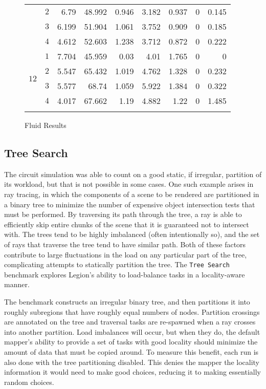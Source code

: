 \begin{figure}
{\begin{tabular}{c@{\hspace{2pt}}cD{.}{.}{3}D{.}{.}{3}@{\hspace{2pt}}D{.}{.}{3}@{\hspace{2pt}}D{.}{.}{3}@{\hspace{2pt}}D{.}{.}{3}@{\hspace{2pt}}D{.}{.}{3}@{\hspace{2pt}}D{.}{.}{3}}
 & $2$ & 6.79 & 48.992 & 0.946 & 3.182 & 0.937 & 0 & 0.145\\
 & $3$ & 6.199 & 51.904 & 1.061 & 3.752 & 0.909 & 0 & 0.185\\
 & $4$ & 4.612 & 52.603 & 1.238 & 3.712 & 0.872 & 0 & 0.222\\
\midrule
{} & $1$ & 7.704 & 45.959 & 0.03 & 4.01 & 1.765 & 0 & 0\\
 & $2$ & 5.547 & 65.432 & 1.019 & 4.762 & 1.328 & 0 & 0.232\\
 & $3$ & 5.577 & 68.74 & 1.059 & 5.922 & 1.384 & 0 & 0.322\\
 & $4$ & 4.017 & 67.662 & 1.19 & 4.882 & 1.22 & 0 & 1.485\\
\bottomrule \\
    \end{tabular}
    \label{sfig:results2:timers}
  }

  \caption{Fluid Results}
\end{figure}


\subsection{Tree Search}

The circuit simulation was able to count on a good static, if irregular,
partition of its workload, but that is not possible in some cases.  One
such example arises in ray tracing, in which the components of a scene to be
rendered are partitioned in a binary tree to minimize the number of expensive
object intersection tests that must be performed.  By traversing its path 
through the tree, a ray is able to efficiently skip entire chunks of the 
scene that it is guaranteed not to intersect with.  The trees tend to be
highly imbalanced (often intentionally so), and the set of rays that traverse
the tree tend to have similar path.  Both of these factors contribute to
large fluctuations in the load on any particular part of the tree, complicating
attempts to statically partition the tree.  The {\tt Tree Search} benchmark
explores Legion's ability to load-balance tasks in a locality-aware manner.

The benchmark constructs an irregular binary tree, and then partitions it into
roughly subregions that have roughly equal numbers of nodes.  Partition
crossings are annotated on the tree and traversal tasks are re-spawned when
a ray crosses into another partition.  Load imbalances will occur, but when
they do, the default mapper's ability to provide a set of tasks with good
locality should minimize the amount of data that must be copied around.  To
measure this benefit, each run is also done with the tree partitioning 
disabled.  This denies the mapper the locality information it would need to 
make good choices, reducing it to making essentially random choices.

